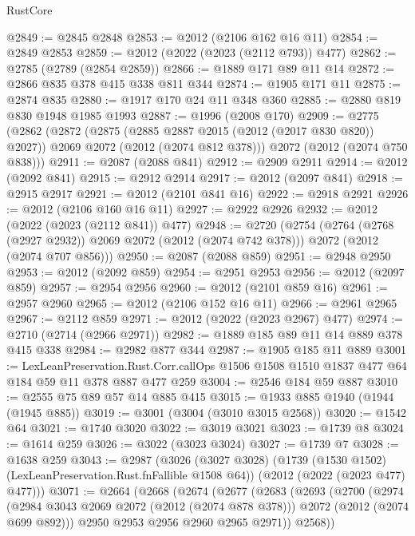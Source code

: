 \begin{lexlean}{RustCore}
\begin{coremodule}
@2849 := @2845 @2848
@2853 := @2012 (@2106 @162 @16 @11)
@2854 := @2849 @2853
@2859 := @2012 (@2022 (@2023 (@2112 @793)) @477)
@2862 := @2785 (@2789 (@2854 @2859))
@2866 := @1889 @171 @89 @11 @14
@2872 := @2866 @835 @378 @415 @338 @811 @344
@2874 := @1905 @171 @11
@2875 := @2874 @835
@2880 := @1917 @170 @24 @11 @348 @360
@2885 := @2880 @819 @830 @1948 @1985 @1993
@2887 := @1996 (@2008 @170)
@2909 := @2775
    (@2862
      (@2872
        (@2875 (@2885 @2887 @2015 (@2012 (@2017 @830 @820)) @2027))
        @2069
        @2072
        (@2012 (@2074 @812 @378)))
      @2072
      (@2012 (@2074 @750 @838)))
@2911 := @2087 (@2088 @841)
@2912 := @2909 @2911
@2914 := @2012 (@2092 @841)
@2915 := @2912 @2914
@2917 := @2012 (@2097 @841)
@2918 := @2915 @2917
@2921 := @2012 (@2101 @841 @16)
@2922 := @2918 @2921
@2926 := @2012 (@2106 @160 @16 @11)
@2927 := @2922 @2926
@2932 := @2012 (@2022 (@2023 (@2112 @841)) @477)
@2948 := @2720
    (@2754
      (@2764 (@2768 (@2927 @2932)) @2069 @2072 (@2012 (@2074 @742 @378)))
      @2072
      (@2012 (@2074 @707 @856)))
@2950 := @2087 (@2088 @859)
@2951 := @2948 @2950
@2953 := @2012 (@2092 @859)
@2954 := @2951 @2953
@2956 := @2012 (@2097 @859)
@2957 := @2954 @2956
@2960 := @2012 (@2101 @859 @16)
@2961 := @2957 @2960
@2965 := @2012 (@2106 @152 @16 @11)
@2966 := @2961 @2965
@2967 := @2112 @859
@2971 := @2012 (@2022 (@2023 @2967) @477)
@2974 := @2710 (@2714 (@2966 @2971))
@2982 := @1889 @185 @89 @11 @14 @889 @378 @415 @338
@2984 := @2982 @877 @344
@2987 := @1905 @185 @11 @889
@3001 := LexLeanPreservation.Rust.Corr.callOps
    @1506
    @1508
    @1510
    @1837
    @477
    @64
    @184
    @59
    @11
    @378
    @887
    @477
    @259
@3004 := @2546 @184 @59 @887
@3010 := @2555 @75 @89 @57 @14 @885 @415
@3015 := @1933 @885 @1940 (@1944 (@1945 @885))
@3019 := @3001 (@3004 (@3010 @3015 @2568))
@3020 := @1542 @64
@3021 := @1740 @3020
@3022 := @3019 @3021
@3023 := @1739 @8
@3024 := @1614 @259
@3026 := @3022 (@3023 @3024)
@3027 := @1739 @7
@3028 := @1638 @259
@3043 := @2987
    (@3026
      (@3027 @3028)
      (@1739 (@1530 @1502) (LexLeanPreservation.Rust.fnFallible @1508 @64))
      (@2012 (@2022 (@2023 @477) @477)))
@3071 := @2664
    (@2668
      (@2674
        (@2677
          (@2683
            (@2693
              (@2700
                (@2974
                  (@2984 @3043 @2069 @2072 (@2012 (@2074 @878 @378)))
                  @2072
                  (@2012 (@2074 @699 @892)))
                @2950
                @2953
                @2956
                @2960
                @2965
                @2971))
            @2568))

\end{coremodule}
\end{lexlean}
